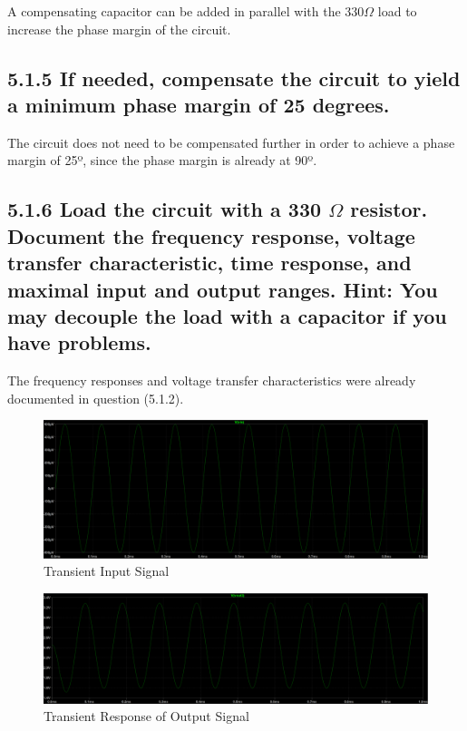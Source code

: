 \documentclass[12pt]{article}
\begin{document}
A compensating capacitor can be added in parallel with the $330\Omega$ load to increase the phase margin of the circuit.

\subsection*{5.1.5 If needed, compensate the circuit to yield a minimum phase margin of 25 degrees.  }

The circuit does not need to be compensated further in order to achieve a phase margin of 25º, since the phase margin is already at 90º. 

\subsection*{5.1.6 Load the circuit with a 330 $\Omega$ resistor. Document the frequency response, 
voltage transfer characteristic, time response, and maximal input and output ranges. 
Hint: You may decouple the load with a capacitor if you have problems.}

The frequency responses and voltage transfer characteristics were already documented in question (5.1.2).

\begin{figure}[H]
    \centering
    \includegraphics[width=1.1\textwidth]{512-3.PNG}
    \caption{Transient Input Signal}
\end{figure}

\begin{figure}[H]
    \centering
    \includegraphics[width=1.1\textwidth]{512-4.PNG}
    \caption{Transient Response of Output Signal}
\end{figure}
\end{document}
